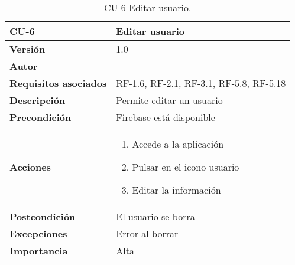 \begin{table}[p]
	\centering
	\begin{tabularx}{\linewidth}{ p{} p{} }
		\toprule
		\textbf{CU-6}    & \textbf{Editar usuario}\\
		\toprule
		\textbf{Versión}              & 1.0    \\
		\textbf{Autor}                & {\nombre} \\
		\textbf{Requisitos asociados} & RF-1.6, RF-2.1, RF-3.1, RF-5.8, RF-5.18 \\
		\textbf{Descripción}          & Permite editar un usuario \\
		\textbf{Precondición}         & Firebase está disponible \\
		\textbf{Acciones}             &
		\begin{enumerate}
			\def\labelenumi{\arabic{enumi}.}
			\tightlist
			\item Accede a la aplicación
			\item Pulsar en el icono usuario
			\item Editar la información
		\end{enumerate}\\
		\textbf{Postcondición}        & El usuario se borra \\
		\textbf{Excepciones}          & Error al borrar \\
		\textbf{Importancia}          & Alta \\
		\bottomrule
	\end{tabularx}
	\caption{CU-6 Editar usuario.}
\end{table}

